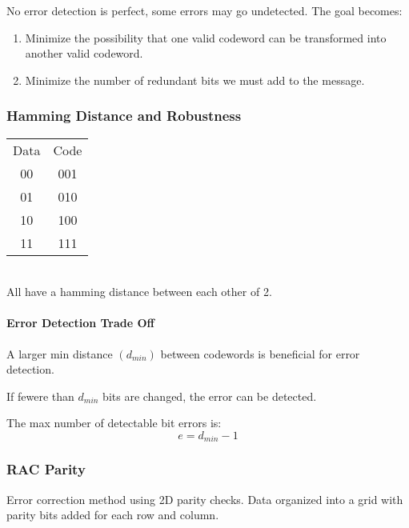 \documentclass{article}
\begin{document}
No error detection is perfect, some errors may go undetected.
The goal becomes:
\begin{enumerate}
    \item Minimize the possibility that one valid codeword can be transformed
          into another valid codeword.
    \item Minimize the number of redundant bits we must add to the message.
\end{enumerate}

\subsubsection*{Hamming Distance and Robustness}
\begin{multicols}{2}
    \begin{tabular}{cc}
        Data & Code \\
        00   & 001  \\
        01   & 010  \\
        10   & 100  \\
        11   & 111  \\
    \end{tabular} \\
    All have a hamming distance between each other of 2.
\end{multicols}

\paragraph*{Error Detection Trade Off}
A larger min distance \((d_{min})\) between codewords is beneficial for error
detection.

If fewere than \(d_{min}\) bits are changed, the error can be detected.

The max number of detectable bit errors is:
\begin{equation*}
    e = d_{min} - 1
\end{equation*}

\subsubsection*{RAC Parity}
Error correction method using 2D parity checks.
Data organized into a grid with parity bits added for each row and column.
\end{document}
